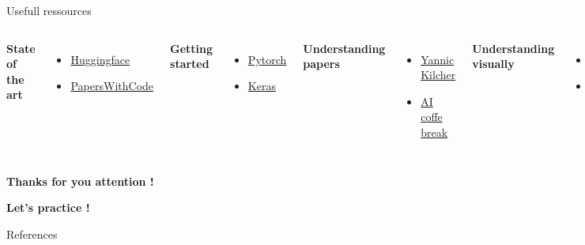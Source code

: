 \documentclass{irdbeamer}
\begin{document}
\begin{frame}{Usefull ressources}
\begin{columns}[t]
    \textbf{State of the art}
    \begin{itemize}
        \item \href{https://huggingface.co/}{Huggingface}
        \item \href{https://paperswithcode.com/sota}{PapersWithCode}
    \end{itemize}
    \textbf{Getting started}
    \begin{itemize}
        \item \href{https://docs.pytorch.org/tutorials/}{Pytorch}
        \item \href{https://keras.io/getting_started/}{Keras}
    \end{itemize}
    \textbf{Understanding papers}
    \begin{itemize}
        \item \href{https://www.youtube.com/@YannicKilcher}{Yannic Kilcher}
        \item \href{https://www.youtube.com/@AICoffeeBreak}{AI coffe break}
    \end{itemize}
    \textbf{Understanding visually}
    \begin{itemize}
        \item \href{https://www.youtube.com/@3blue1brown}{3blue1brown}
        \item \href{https://www.youtube.com/@Deepia-ls2fo}{deepia}
    \end{itemize}
\end{columns}

\end{frame}

\begin{frame}[plain]
    \Huge{\textbf{Thanks for you attention !}}
    
    \vfill
    
    \LARGE{\textbf{Let's practice !}}
\end{frame}

\appendix
\begin{frame}[allowframebreaks]{References}
    {\footnotesize \printbibliography[heading=none]}
\end{frame}
\end{document}
